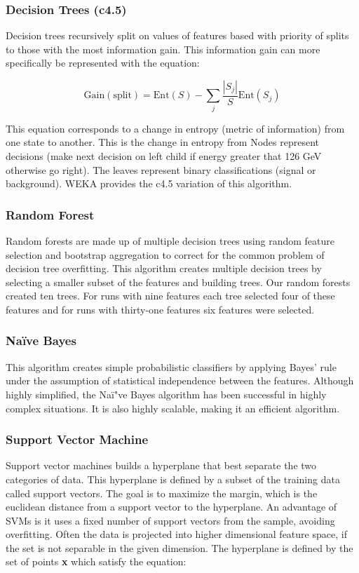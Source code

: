 \documentclass[aps, reprint, amsmath, amssymb]{revtex4-1}
\begin{document}
\subsubsection{Decision Trees (c4.5)}
Decision trees recursively split on values of features based with priority of splits to those with the most information gain. This information gain can more specifically be represented with the equation:

\begin{equation}
\textrm{Gain} (\textrm{split}) = \textrm{Ent} (S) - \sum \limits_j \dfrac{|S_j|}{S} \textrm{Ent}(S_j)
\end{equation}

This equation corresponds to a change in entropy (metric of information) from one state to another. This is the change in entropy from Nodes represent decisions (make next decision on left child if energy greater that 126 GeV otherwise go right). The leaves represent binary classifications (signal or background). WEKA provides the c4.5 variation of this algorithm.

\subsubsection{Random Forest}
Random forests are made up of multiple decision trees using random feature selection and bootstrap aggregation to correct for the common problem of decision tree overfitting.  This algorithm creates multiple decision trees by selecting a smaller subset of the features and building trees. Our random forests created ten trees.  For runs with nine features each tree selected four of these features and for runs with thirty-one features six features were selected.

\subsubsection{Na{\"i}ve Bayes}
This algorithm creates simple probabilistic classifiers by applying Bayes' rule under the assumption of statistical independence between the features.  Although highly simplified, the Na{\"i"}ve Bayes algorithm has been successful in highly complex situations.  It is also highly scalable, making it an efficient algorithm.  

\subsubsection{Support Vector Machine}
Support vector machines builds a hyperplane that best separate the two categories of data. This hyperplane is defined by a subset of the training data called support vectors. The goal is to maximize the margin, which is the euclidean distance from a support vector to the hyperplane.  An advantage of SVMs is it uses a fixed number of support vectors from the sample, avoiding overfitting.  Often the data is projected into higher dimensional feature space, if the set is not separable in the given dimension.  The hyperplane is defined by the set of points \textbf{x} which satisfy the equation:
\end{document}
